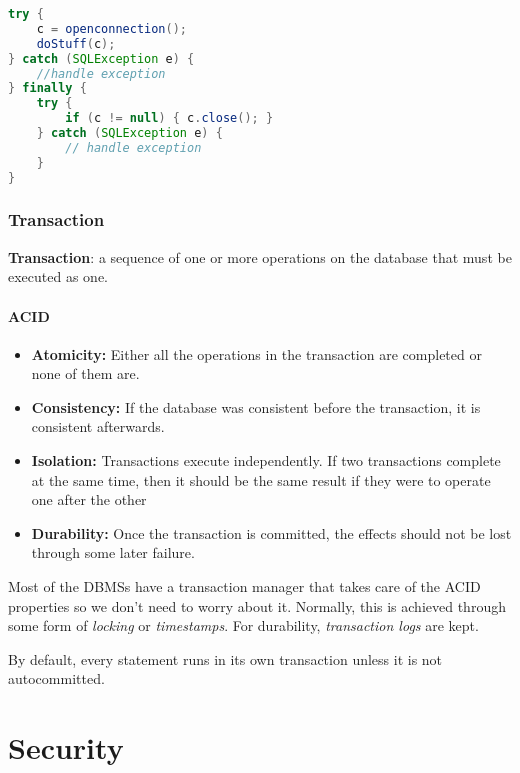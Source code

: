 \documentclass[11pt,a4paper,titlepage,dvipsnames,cmyk]{scrartcl}
\begin{document}
\begin{lstlisting}[language=Java]
try {
    c = openconnection();
    doStuff(c);
} catch (SQLException e) {
    //handle exception
} finally {
    try {
        if (c != null) { c.close(); }
    } catch (SQLException e) {
        // handle exception
    }
}
\end{lstlisting}

\subsubsection{Transaction}%
\label{ssub:Transaction}
\begin{tcolorbox}
    \textbf{Transaction}: a sequence of one or more operations on the
    database that must be executed as one.
\end{tcolorbox}

\paragraph{ACID}%
\label{par:ACID}

\begin{itemize}
    \item \textbf{Atomicity:} Either all the operations in the transaction
        are completed or none of them are.
    \item \textbf{Consistency:} If the database was consistent before the
        transaction, it is consistent afterwards.
    \item \textbf{Isolation:} Transactions execute independently. If two
        transactions complete at the same time, then it should be the same
        result if they were to operate one after the other
    \item \textbf{Durability:} Once the transaction is committed, the
        effects should not be lost through some later failure.
\end{itemize}

Most of the DBMSs have a transaction manager that takes care of the ACID
properties so we don't need to worry about it. Normally, this is achieved
through some form of \textit{locking} or \textit{timestamps}. For
durability, \textit{transaction logs} are kept.

By default, every statement runs in its own transaction unless it is not
autocommitted.

\section{Security}%
\label{sec:Security}
\end{document}
